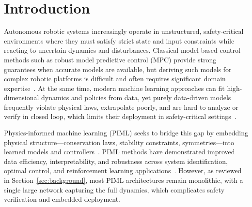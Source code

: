 \documentclass[12pt,a4paper]{article}
\begin{document}
\section{Introduction}
\label{sec:intro}

Autonomous robotic systems increasingly operate in unstructured,
safety-critical environments where they must satisfy strict state and
input constraints while reacting to uncertain dynamics and
disturbances. Classical model-based control methods such as robust model
predictive control (MPC) provide strong guarantees when accurate models
are available, but deriving such models for complex robotic platforms is
difficult and often requires significant domain
expertise~\cite{mayne2005robust,mayne2014mpc}. At the same time,
modern machine learning approaches can fit high-dimensional dynamics and
policies from data, yet purely data-driven models frequently violate
physical laws, extrapolate poorly, and are hard to analyze or verify in
closed loop, which limits their deployment in safety-critical
settings~\cite{nghiem2023piml,brunke2022safe}.

Physics-informed machine learning (PIML) seeks to bridge this gap by
embedding physical structure---conservation laws, stability constraints,
symmetries---into learned models and
controllers~\cite{rackauckas2021ude,greydanus2019hnn,legaard2023physss}.
PIML methods have demonstrated improved data efficiency,
interpretability, and robustness across system identification, optimal
control, and reinforcement learning
applications~\cite{nghiem2023piml,antonelo2024pinncontrol,ordonez2023pirl,lutter2023lagrangian}.
However, as reviewed in Section~\ref{sec:background}, most PIML
architectures remain monolithic, with a single large network capturing
the full dynamics, which complicates safety verification and embedded
deployment.
\end{document}
